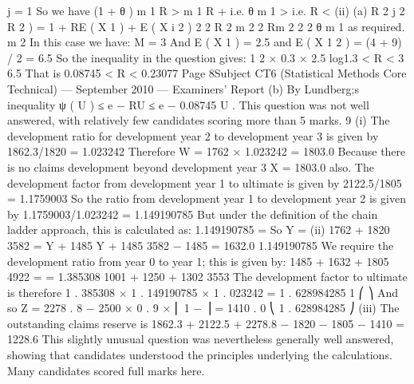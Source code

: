 j = 1
So we have (1 + θ ) m 1 R > m 1 R +
i.e. θ m 1 >
i.e. R <
(ii)
(a)
R 2 j 2
R 2
) = 1 + RE ( X 1 ) +
E ( X i 2 )
2
2
R 2 m 2
2
Rm 2
2
2 θ m 1
as required.
m 2
In this case we have:
M = 3
And E ( X 1 ) = 2.5 and E ( X 1 2 ) = (4 + 9) / 2 = 6.5
So the inequality in the question gives:
1
2 × 0.3 × 2.5
log1.3 < R <
3
6.5
That is 0.08745 < R < 0.23077
Page 8Subject CT6 (Statistical Methods Core Technical) — September 2010 — Examiners’ Report
(b)
By Lundberg;s inequality ψ ( U ) ≤ e − RU ≤ e − 0.08745 U .
This question was not well answered, with relatively few candidates scoring more than 5
marks.
9
(i)
The development ratio for development year 2 to development year 3 is given
by 1862.3/1820 = 1.023242
Therefore W = 1762 × 1.023242 = 1803.0
Because there is no claims development beyond development year 3
X = 1803.0 also.
The development factor from development year 1 to ultimate is given by
2122.5/1805 = 1.1759003
So the ratio from development year 1 to development year 2 is given by
1.1759003/1.023242 = 1.149190785
But under the definition of the chain ladder approach, this is calculated as:
1.149190785 =
So Y =
(ii)
1762 + 1820
3582
=
Y + 1485
Y + 1485
3582
− 1485 = 1632.0
1.149190785
We require the development ratio from year 0 to year 1; this is given by:
1485 + 1632 + 1805 4922
=
= 1.385308
1001 + 1250 + 1302 3553
The development factor to ultimate is therefore
1 . 385308 × 1 . 149190785 × 1 . 023242 = 1 . 628984285
1
⎛
⎞
And so Z = 2278 . 8 − 2500 × 0 . 9 × ⎜ 1 −
⎟ = 1410 . 0
⎝ 1 . 628984285 ⎠
(iii)
The outstanding claims reserve is
1862.3 + 2122.5 + 2278.8 − 1820 − 1805 − 1410 = 1228.6
This slightly unusual question was nevertheless generally well answered, showing that
candidates understood the principles underlying the calculations. Many candidates scored
full marks here.
